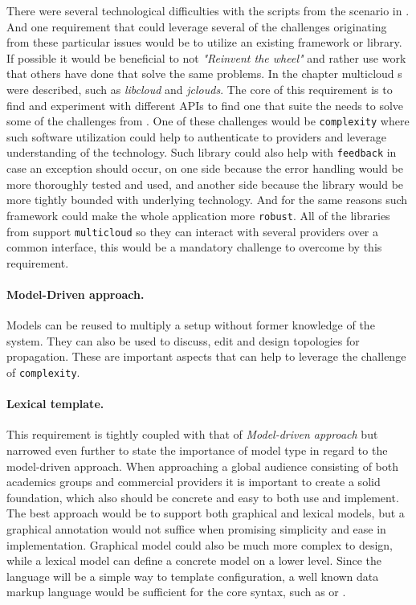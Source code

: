 There were several technological difficulties with the scripts from the scenario in 
.
And one requirement that could leverage several of the challenges
originating from these particular issues would be to utilize an existing framework or library.
If possible it would be beneficial to not \emph{"Reinvent the wheel"} and rather use work
that others have done that solve the same problems.
In the chapter  multicloud s 
were described, such as \emph{libcloud} and \emph{jclouds}.
The core of this requirement is to find and experiment with different APIs to find one
that suite the needs to solve some of the challenges from .
One of these challenges would be \texttt{complexity} where such software utilization
could help to authenticate to providers and leverage understanding of the technology.
Such library could also help with \texttt{feedback} in case an exception should occur, on one
side because the error handling would be more thoroughly tested and used,
and another side because the library would be more tightly bounded with underlying technology.
And for the same reasons such framework could make the whole application more \texttt{robust}.
All of the libraries from  support \texttt{multicloud} so they can
interact with several providers over a common interface, this would be a mandatory challenge
to overcome by this requirement.

\paragraph{Model-Driven approach.}

Models can be reused to multiply a setup without former knowledge of the system.
They can also be used to discuss, edit and design topologies for propagation. 
These are important aspects that can help to leverage the challenge of \texttt{complexity}.

\paragraph{Lexical template.}

This requirement is tightly coupled with that of \emph{Model-driven approach} but narrowed 
even further to state the importance of model type in regard to the model-driven approach.
When approaching a global audience consisting of both academics groups and commercial
providers it is important to create a solid foundation, 
which also should be concrete and easy to both use and implement.
The best approach would be to support both graphical and lexical models, 
but a graphical annotation would not suffice when promising simplicity and ease in implementation. 
Graphical model could also be much more complex to design, 
while a lexical model can define a concrete model on a lower level.
Since the language will be a simple way to template configuration, 
a well known data markup language would be sufficient for the core syntax, such as 
 or .

